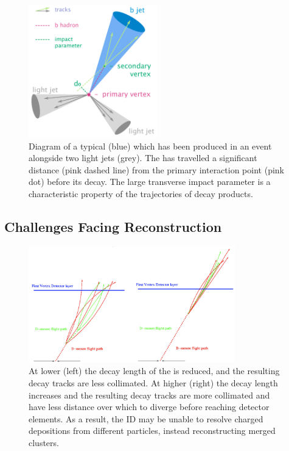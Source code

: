 \begin{figure}[!htbp]
  \centering
  \includegraphics[width=0.5\textwidth]{chapters/3.tracking/figs/b-jet-diagram.png}
  \caption{
    Diagram of a typical \bjet (blue) which has been produced in an event alongside two light jets (grey).
    The \bhadron has travelled a significant distance (pink dashed line) from the primary interaction point (pink dot) before its decay.
    The large transverse impact parameter \dzero is a characteristic property of the trajectories of \bhadron decay products.}
  \label{fig:bjet_diagram}
\end{figure}




\subsection{Challenges Facing \bhadron Reconstruction}\label{sec:b_track_reco_challenges}

\begin{figure}[!htbp]
  \centering
  \includegraphics[width=0.8\textwidth]{chapters/3.tracking/figs/high-pt-b-tracks.png}
  \caption{
    At lower \pt (left) the decay length of the \bhadron is reduced, and the resulting decay tracks are less collimated.
    At higher \pt (right) the \bhadron decay length increases and the resulting decay tracks are more collimated and have less distance over which to diverge before reaching detector elements.
    As a result, the ID may be unable to resolve charged depositions from different particles, instead reconstructing merged clusters.
  }
  \label{fig:high_pt_b_decay}
\end{figure}

